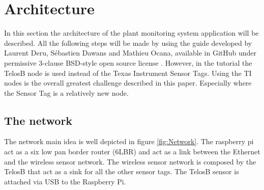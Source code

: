\section{Architecture}
In this section the architecture of the plant monitoring system application will be described. All the following steps will be made by using the guide developed by Laurent Deru, Sébastien Dawans and Mathieu Ocana, available in GitHub under permissive 3-clause BSD-style open source license \cite{6lbr}. However, in the tutorial the TelosB node is used instead of the Texas Instrument Sensor Tags. Using the TI nodes is the overall greatest challenge described in this paper. Especially where the Sensor Tag is a relatively new node.\\
\subsection{The network}
The network main idea is well depicted in figure \ref{fig:Network}. The raspberry pi act as a six low pan border router (6LBR) and act as a link between the Ethernet and the wireless sensor network. The wireless sensor network is composed by the TelosB that act as a sink for all the other sensor tags. The TelosB sensor is attached via USB to the Raspberry Pi.
